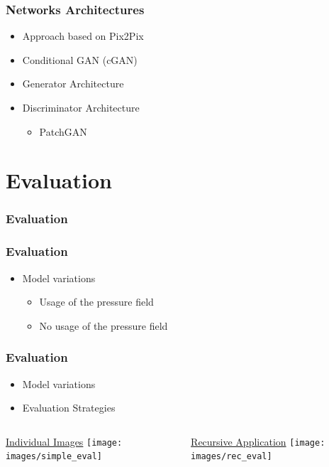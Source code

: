 \documentclass[18pt, xcolor=table]{beamer}
\begin{document}
\begin{frame}[t]
  \frametitle{Networks Architectures}
  \begin{itemize}
  \item Approach based on Pix2Pix
  \item Conditional GAN (cGAN)
  \item Generator Architecture
  \item Discriminator Architecture
    \begin{itemize}
    \item PatchGAN
    \end{itemize}
  \end{itemize}

\end{frame}

\section{Evaluation}

\begin{frame}[t]
  \frametitle{Evaluation}
\end{frame}

\begin{frame}[t]
  \frametitle{Evaluation}
  \begin{itemize}
  \item Model variations
    \begin{itemize}
    \item Usage of the pressure field
    \item No usage of the pressure field
    \end{itemize}
  \end{itemize}
\end{frame}

\begin{frame}[t]
  \frametitle{Evaluation}
  \begin{itemize}
  \item Model variations
  \item Evaluation Strategies
  \end{itemize}

  \vspace{-0.7cm}

  \begin{columns}[t]
    \begin{column}{0.5\textwidth}
      \begin{center}
        {\large \underline{Individual Images}}
        \texttt{[image: images/simple\_eval]}
      \end{center}
    \end{column}
    \begin{column}{0.5\textwidth}
      \begin{center}
        {\large \underline{Recursive Application}}
        \texttt{[image: images/rec\_eval]}
      \end{center}
    \end{column}
  \end{columns}
\end{frame}
\end{document}
